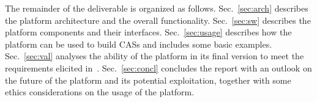 
The remainder of the deliverable is organized as follows. Sec.~\ref{sec:arch} describes the platform architecture and the overall functionality. Sec.~\ref{sec:sw} describes the platform components and their interfaces. Sec.~\ref{sec:usage} describes how the platform can be used to build CASs and includes some basic examples. Sec.~\ref{sec:val} analyses the ability of the platform in its final version to meet the requirements elicited in~\cite{D8.1}. Sec.~\ref{sec:concl} concludes the report with an outlook on the future of the platform and its potential exploitation, together with some ethics considerations on the usage of the platform.



